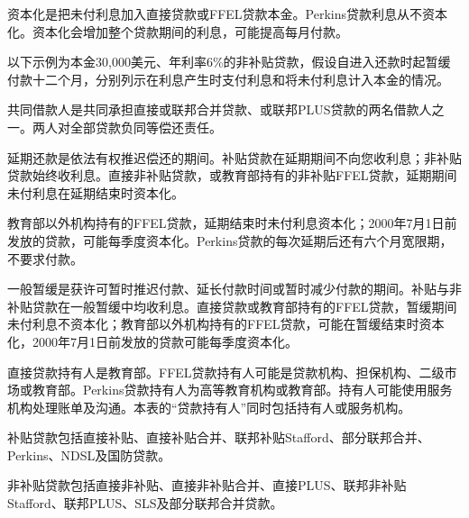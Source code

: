 \documentclass[UTF8,fontset=none,11pt,a4paper]{ctexart}
\begin{document}
资本化是把未付利息加入直接贷款或FFEL贷款本金。Perkins贷款利息从不资本化。资本化会增加整个贷款期间的利息，可能提高\allowbreak\mbox{每月付款。}


以下示例为本金30,000美元、年利率6\%的非补贴贷款，假设自进入还款时起暂缓付款十二个月，分别列示在利息产生时支付利息和将未付利息计入本\allowbreak\mbox{金的情况。}


共同借款人是共同承担直接或联邦合并贷款、或联邦PLUS贷款的两名借款人之一。两人对全部贷款负同等\allowbreak\mbox{偿还责任。}


延期还款是依法有权推迟偿还的期间。补贴贷款在延期期间不向您收利息；非补贴贷款始终收利息。直接非补贴贷款，或教育部持有的非补贴FFEL贷款，延期期间未付利息在延期结束\allowbreak\mbox{时资本化。}


教育部以外机构持有的FFEL贷款，延期结束时未付利息资本化；2000年7月1日前发放的贷款，可能每季度资本化。Perkins贷款的每次延期后还有六个月宽限期，不\allowbreak\mbox{要求付款。}


一般暂缓是获许可暂时推迟付款、延长付款时间或暂时减少付款的期间。补贴与非补贴贷款在一般暂缓中均收利息。直接贷款或教育部持有的FFEL贷款，暂缓期间未付利息不资本化；教育部以外机构持有的FFEL贷款，可能在暂缓结束时资本化，2000年7月1日前发放的贷款可能每季\allowbreak\mbox{度资本化。}


直接贷款持有人是教育部。FFEL贷款持有人可能是贷款机构、担保机构、二级市场或教育部。Perkins贷款持有人为高等教育机构或教育部。持有人可能使用服务机构处理账单及沟通。本表的“贷款持有人”同时包括持有人或\allowbreak\mbox{服务机构。}


补贴贷款包括直接补贴、直接补贴合并、联邦补贴Stafford、部分联邦合并、Perkins、NDSL及\allowbreak\mbox{国防贷款。}


非补贴贷款包括直接非补贴、直接非补贴合并、直接PLUS、联邦非补贴Stafford、联邦PLUS、SLS及部分联邦\allowbreak\mbox{合并贷款。}
\end{document}
